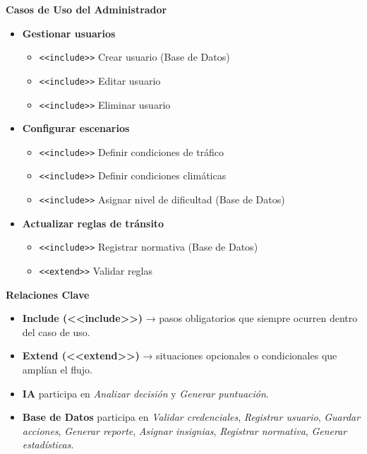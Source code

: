 \documentclass[12pt]{article}
\begin{document}
\noindent
\textbf{Casos de Uso del Administrador}
\begin{itemize}
    \item \textbf{Gestionar usuarios}
    \begin{itemize}
        \item \texttt{<<include>>} Crear usuario (Base de Datos)
        \item \texttt{<<include>>} Editar usuario
        \item \texttt{<<include>>} Eliminar usuario
    \end{itemize}

    \item \textbf{Configurar escenarios}
    \begin{itemize}
        \item \texttt{<<include>>} Definir condiciones de tráfico
        \item \texttt{<<include>>} Definir condiciones climáticas
        \item \texttt{<<include>>} Asignar nivel de dificultad (Base de Datos)
    \end{itemize}

    \item \textbf{Actualizar reglas de tránsito}
    \begin{itemize}
        \item \texttt{<<include>>} Registrar normativa (Base de Datos)
        \item \texttt{<<extend>>} Validar reglas
    \end{itemize}
    
\end{itemize}

\noindent
\textbf{Relaciones Clave}
\begin{itemize}
    \item \textbf{Include (<<include>>)} → pasos obligatorios que siempre ocurren dentro del caso de uso.
    \item \textbf{Extend (<<extend>>)} → situaciones opcionales o condicionales que amplían el flujo.
    \item \textbf{IA} participa en \textit{Analizar decisión} y \textit{Generar puntuación}.
    \item \textbf{Base de Datos} participa en \textit{Validar credenciales}, \textit{Registrar usuario}, \textit{Guardar acciones}, \textit{Generar reporte}, \textit{Asignar insignias}, \textit{Registrar normativa}, \textit{Generar estadísticas}.
\end{itemize}
\end{document}
